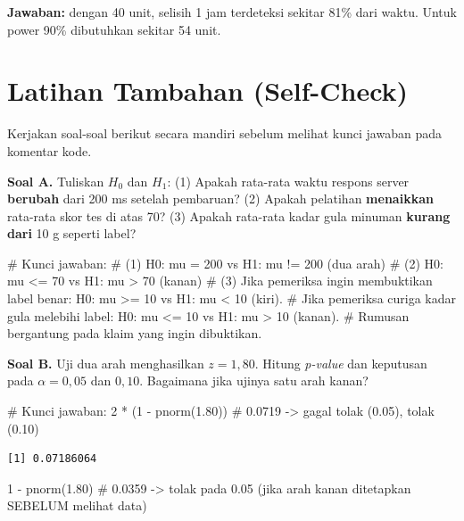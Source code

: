 \documentclass[
  indonesian,
  letterpaper,
]{book}
\newenvironment{Shaded}{\begin{snugshade}}{\end{snugshade}}
\newcommand{\CommentTok}[1]{\textcolor[rgb]{0.37,0.37,0.37}{#1}}
\newcommand{\DecValTok}[1]{\textcolor[rgb]{0.68,0.00,0.00}{#1}}
\newcommand{\FloatTok}[1]{\textcolor[rgb]{0.68,0.00,0.00}{#1}}
\newcommand{\FunctionTok}[1]{\textcolor[rgb]{0.28,0.35,0.67}{#1}}
\newcommand{\NormalTok}[1]{\textcolor[rgb]{0.00,0.23,0.31}{#1}}
\newcommand{\SpecialCharTok}[1]{\textcolor[rgb]{0.37,0.37,0.37}{#1}}
\begin{document}
\textbf{Jawaban:} dengan 40 unit, selisih 1 jam terdeteksi sekitar 81\%
dari waktu. Untuk power 90\% dibutuhkan sekitar 54 unit.

\section{Latihan Tambahan
(Self-Check)}\label{latihan-tambahan-self-check}

Kerjakan soal-soal berikut secara mandiri sebelum melihat kunci jawaban
pada komentar kode.

\textbf{Soal A.} Tuliskan \(H_0\) dan \(H_1\): (1) Apakah rata-rata
waktu respons server \textbf{berubah} dari 200 ms setelah pembaruan? (2)
Apakah pelatihan \textbf{menaikkan} rata-rata skor tes di atas 70? (3)
Apakah rata-rata kadar gula minuman \textbf{kurang dari} 10 g seperti
label?

\begin{Shaded}
\begin{Highlighting}[]
\CommentTok{\# Kunci jawaban:}
\CommentTok{\# (1) H0: mu = 200  vs  H1: mu != 200  (dua arah)}
\CommentTok{\# (2) H0: mu \textless{}= 70  vs  H1: mu \textgreater{} 70    (kanan)}
\CommentTok{\# (3) Jika pemeriksa ingin membuktikan label benar: H0: mu \textgreater{}= 10 vs H1: mu \textless{} 10 (kiri).}
\CommentTok{\#     Jika pemeriksa curiga kadar gula melebihi label: H0: mu \textless{}= 10 vs H1: mu \textgreater{} 10 (kanan).}
\CommentTok{\#     Rumusan bergantung pada klaim yang ingin dibuktikan.}
\end{Highlighting}
\end{Shaded}

\textbf{Soal B.} Uji dua arah menghasilkan \(z = 1{,}80\). Hitung
\emph{p-value} dan keputusan pada \(\alpha = 0{,}05\) dan \(0{,}10\).
Bagaimana jika ujinya satu arah kanan?

\begin{Shaded}
\begin{Highlighting}[]
\CommentTok{\# Kunci jawaban:}
\DecValTok{2} \SpecialCharTok{*}\NormalTok{ (}\DecValTok{1} \SpecialCharTok{{-}} \FunctionTok{pnorm}\NormalTok{(}\FloatTok{1.80}\NormalTok{))   }\CommentTok{\# 0.0719 {-}\textgreater{} gagal tolak (0.05), tolak (0.10)}
\end{Highlighting}
\end{Shaded}

\begin{verbatim}
[1] 0.07186064
\end{verbatim}

\begin{Shaded}
\begin{Highlighting}[]
\DecValTok{1} \SpecialCharTok{{-}} \FunctionTok{pnorm}\NormalTok{(}\FloatTok{1.80}\NormalTok{)         }\CommentTok{\# 0.0359 {-}\textgreater{} tolak pada 0.05 (jika arah kanan ditetapkan SEBELUM melihat data)}
\end{Highlighting}
\end{Shaded}
\end{document}
